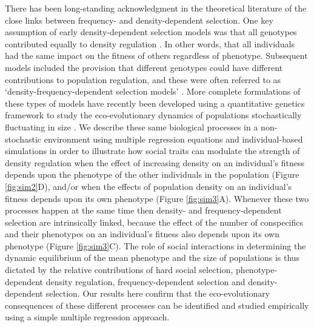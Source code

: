\documentclass{article}
\begin{document}
There has been long-standing acknowledgment in the theoretical literature of the close links between frequency- and density-dependent selection. One key assumption of early density-dependent selection models was that all genotypes contributed equally to density regulation \citep{Joshi2001}. In other words, that all individuals had the same impact on the fitness of others regardless of phenotype. Subsequent models included the provision that different genotypes could have different contributions to population regulation, and these were often referred to as `density-frequency-dependent selection models' \citep{Anderson1971, Matessi1976, Asmussen1983}. More complete formulations of these types of models have recently been developed using a quantitative genetics framework to study the eco-evolutionary dynamics of populations stochastically fluctuating in size \citep{Lande2007, Engen2020}. We describe these same biological processes in a non-stochastic environment using multiple regression equations and individual-based simulations in order to illustrate how social traits can modulate the strength of density regulation when the effect of increasing density on an individual's fitness depends upon the phenotype of the other individuals in the population (Figure \ref{fig:sim2}D), and/or when the effects of population density on an individual's fitness depends upon its own phenotype (Figure \ref{fig:sim3}A). Whenever these two processes happen at the same time then density- and frequency-dependent selection are intrinsically linked, because the effect of the number of conspecifics and their phenotypes on an individual's fitness also depends upon its own phenotype (Figure \ref{fig:sim3}C). The role of social interactions in determining the dynamic equilibrium of the mean phenotype and the size of populations is thus dictated by the relative contributions of hard social selection, phenotype-dependent density regulation, frequency-dependent selection and density-dependent selection. Our results here confirm that the eco-evolutionary consequences of these different processes can be identified and studied empirically using a simple multiple regression approach. 
\end{document}
